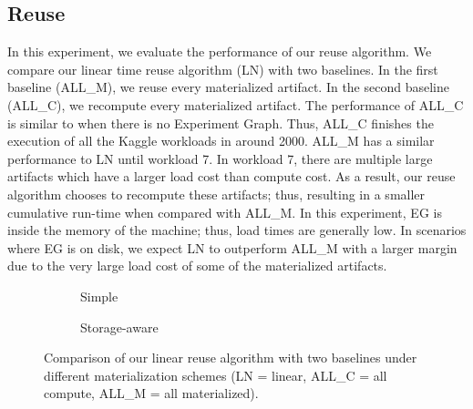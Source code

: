 \subsection{Reuse}
In this experiment, we evaluate the performance of our reuse algorithm.
We compare our linear time reuse algorithm (LN) with two baselines.
In the first baseline (ALL\_M), we reuse every materialized artifact.
In the second baseline (ALL\_C), we recompute every materialized artifact.
The performance of ALL\_C is similar to when there is no Experiment Graph.
Thus, ALL\_C finishes the execution of all the Kaggle workloads in around 2000.
ALL\_M has a similar performance to LN until workload 7.
In workload 7, there are multiple large artifacts which have a larger load cost than compute cost.
As a result, our reuse algorithm chooses to recompute these artifacts; thus, resulting in a smaller cumulative run-time when compared with ALL\_M.
In this experiment, EG is inside the memory of the machine; thus, load times are generally low.
In scenarios where EG is on disk, we expect LN to outperform ALL\_M with a larger margin due to the very large load cost of some of the materialized artifacts.
\begin{figure}
\begin{subfigure}[b]{0.5\linewidth}
\centering
 \resizebox{\columnwidth}{!}{%
%
}
\caption{Simple}
\end{subfigure}%
\begin{subfigure}[b]{0.5\linewidth}
\centering
 \resizebox{\columnwidth}{!}{%
%
}

\caption{Storage-aware}
\end{subfigure}
\caption{Comparison of our linear reuse algorithm with two baselines under different materialization schemes (LN = linear, ALL\_C = all compute, ALL\_M = all materialized).}
\end{figure}

